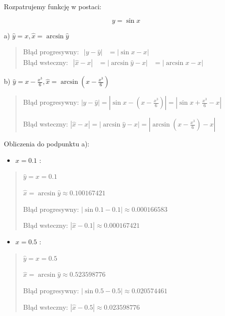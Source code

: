\documentclass[10pt]{article}
\begin{document}
Rozpatrujemy funkcję w postaci:

$$
y=\sin x
$$

a) $\hat{y}=x, \hat{x}=\arcsin \hat{y}$

\begin{quote}
  Błąd progresywny: $\begin{aligned} |y-\hat{y}| &= |\sin x-x| \end{aligned}$ \\[1em]
  Błąd wsteczny: $\begin{aligned} |\hat{x}-x| &= |\arcsin \hat{y}-x| &= |\arcsin x-x| \end{aligned}$
  \end{quote}


b) $\hat{y}=x-\frac{x^{3}}{6}, \hat{x}=\arcsin \left(x-\frac{x^{3}}{6}\right)$

  \begin{quote}
  Błąd progresywny: $|y-\hat{y}|=\left|\sin x-\left(x-\frac{x^{3}}{6}\right)\right|=\left|\sin x+\frac{x^{3}}{6}-x\right|$
  
  Błąd wsteczny: $|\hat{x}-x|=|\arcsin \hat{y}-x|=\left|\arcsin \left(x-\frac{x^{3}}{6}\right)-x\right|$
  \end{quote}


Obliczenia do podpunktu a):
\begin{itemize}
  \item $x=0.1$ :
\end{itemize}

\begin{quote}
        $\hat{y}=x=0.1$

        $\hat{x}=\arcsin \hat{y} \approx 0.100167421$

        Błąd progresywny: $|\sin 0.1-0.1| \approx 0.000166583$

        Błąd wsteczny: $|\hat{x}-0.1| \approx 0.000167421$
  \end{quote}

\begin{itemize}
  \item $x=0.5$ :
\end{itemize}

\begin{quote}
        $\hat{y}=x=0.5$

        $\hat{x}=\arcsin \hat{y} \approx 0.523598776$

        Błąd progresywny: $|\sin 0.5-0.5| \approx 0.020574461$

        Błąd wsteczny: $|\hat{x}-0.5| \approx 0.023598776$
\end{quote}
\end{document}
